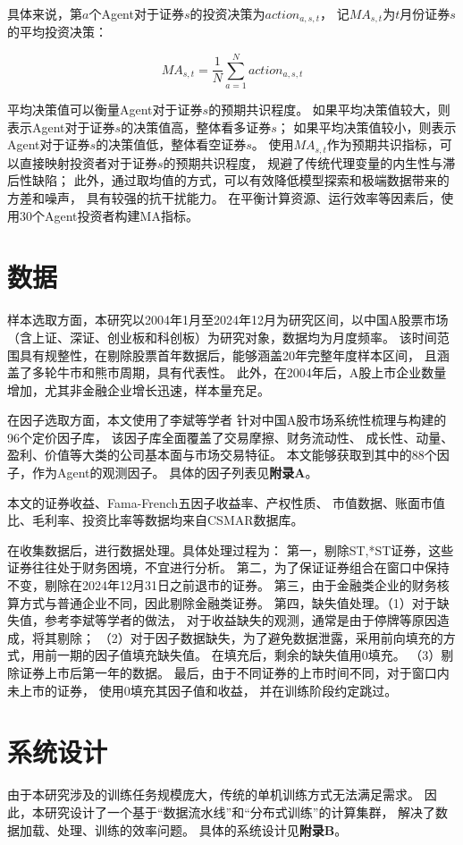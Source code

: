 具体来说，第$a$个Agent对于证券$s$的投资决策为$action_{a,s,t}$，
记$MA_{s,t}$为$t$月份证券$s$的平均投资决策：

\[MA_{s,t} = \frac{1}{N} \sum_{a=1}^{N} action_{a,s,t}\]

平均决策值可以衡量Agent对于证券$s$的预期共识程度。
如果平均决策值较大，则表示Agent对于证券$s$的决策值高，整体看多证券$s$；
如果平均决策值较小，则表示Agent对于证券$s$的决策值低，整体看空证券$s$。
使用$MA_{s,t}$作为预期共识指标，可以直接映射投资者对于证券$s$的预期共识程度，
规避了传统代理变量的内生性与滞后性缺陷；
此外，通过取均值的方式，可以有效降低模型探索和极端数据带来的方差和噪声，
具有较强的抗干扰能力。
在平衡计算资源、运行效率等因素后，使用30个Agent投资者构建MA指标。

\section{数据}
样本选取方面，本研究以2004年1月至2024年12月为研究区间，以中国A股票市场
（含上证、深证、创业板和科创板）为研究对象，数据均为月度频率。
该时间范围具有规整性，在剔除股票首年数据后，能够涵盖20年完整年度样本区间，
且涵盖了多轮牛市和熊市周期，具有代表性。
此外，在2004年后，A股上市企业数量增加，尤其非金融企业增长迅速，样本量充足。

在因子选取方面，本文使用了李斌等学者\cite{li2019machine}
针对中国A股市场系统性梳理与构建的96个定价因子库，
该因子库全面覆盖了交易摩擦、财务流动性、
成长性、动量、盈利、价值等大类的公司基本面与市场交易特征。
本文能够获取到其中的88个因子，作为Agent的观测因子。
具体的因子列表见\textbf{附录A}。

本文的证券收益、Fama-French五因子收益率、产权性质、
市值数据、账面市值比、毛利率、投资比率等数据均来自CSMAR数据库。

在收集数据后，进行数据处理。具体处理过程为：
第一，剔除ST,*ST证券，这些证券往往处于财务困境，不宜进行分析。  
第二，为了保证证券组合在窗口中保持不变，剔除在2024年12月31日之前退市的证券。  
第三，由于金融类企业的财务核算方式与普通企业不同，因此剔除金融类证券。
第四，缺失值处理。（1）对于缺失值，参考李斌等学者\cite{li2019machine}的做法，
对于收益缺失的观测，通常是由于停牌等原因造成，将其剔除；
（2）对于因子数据缺失，为了避免数据泄露，采用前向填充的方式，用前一期的因子值填充缺失值。
在填充后，剩余的缺失值用0填充。
（3）剔除证券上市后第一年的数据。
最后，由于不同证券的上市时间不同，对于窗口内未上市的证券，
使用0填充其因子值和收益，
并在训练阶段约定跳过。

\section{系统设计}
由于本研究涉及的训练任务规模庞大，传统的单机训练方式无法满足需求。
因此，本研究设计了一个基于“数据流水线”和“分布式训练”的计算集群，
解决了数据加载、处理、训练的效率问题。
具体的系统设计见\textbf{附录B}。  
